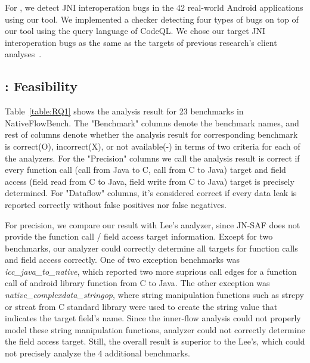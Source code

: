 
For , we detect JNI interoperation bugs in the 42 real-world Android
applications using our tool. We implemented a checker detecting four types of
bugs on top of our tool using the query language of CodeQL. We chose our target
JNI interoperation bugs as the same as the targets of previous research's
client analyses~\cite{LeeASE20, ILEA}.


\subsection{: Feasibility}

Table~\ref{table:RQ1} shows the analysis result for 23 benchmarks in
NativeFlowBench.  The "Benchmark" columns denote the benchmark names, and rest
of columns denote whether the analysis result for corresponding benchmark is
correct(O), incorrect(X), or not available(-) in terms of two criteria for each
of the analyzers. For the "Precision" columns we call the analysis result is
correct if every function call (call from Java to C, call from C to Java)
target and field access (field read from C to Java, field write from C to Java)
target is precisely determined. For "Dataflow" columns, it's considered correct
if every data leak is reported correctly without false positives nor false
negatives. 

For precision, we compare our result with Lee's analyzer, since JN-SAF does not
provide the function call / field access target information. Except for two
benchmarks, our analyzer could correctly determine all targets for function
calls and field access correctly.  One of two exception benchmarks was
\textit{icc\_java\_to\_native}, which reported two more suprious call edges for
a function call of android library function from C to Java. The other exception
was \textit{native\_complexdata\_stringop}, where string manipulation functions
such as strcpy or strcat from C standard library were used to create the string
value that indicates the target field's name. Since the inner-flow analysis
could not properly model these string manipulation functions, analyzer could
not correctly determine the field access target. Still, the overall result is
superior to the Lee's, which could not precisely analyze the 4 additional
benchmarks.


